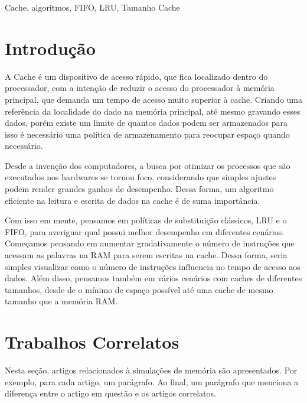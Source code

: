 \documentclass[conference]{IEEEtran}
\begin{document}
\begin{IEEEkeywords}
Cache, algoritmos, FIFO, LRU, Tamanho Cache
\end{IEEEkeywords}

\section{Introdução}


A  Cache é um dispositivo de acesso rápido, que fica localizado dentro do processador, com a intenção de reduzir o acesso do processador à memória principal, que demanda um tempo de acesso muito superior à cache. Criando uma referência da localidade do dado na memória principal, até mesmo gravando esses dados,
porém existe um limite de quantos dados podem ser armazenados para isso é necessário uma política de armazenamento para reocupar espaço quando necessário.

Desde a invenção dos computadores, a busca por otimizar os processos que são executados nos hardwares se tornou foco, considerando que simples ajustes podem render grandes ganhos de desempenho. Dessa forma, um algoritmo eficiente na leitura e escrita de dados na cache é de suma importância. 

Com isso em mente, pensamos em políticas de substituição clássicos, LRU e o FIFO, para averiguar qual possui melhor desempenho em diferentes cenários. Começamos pensando em aumentar gradativamente o número de instruções que acessam as palavras na RAM para serem escritas na cache. Dessa forma, seria simples 
visualizar como o número de instruções influencia no tempo de acesso aos dados. Além disso, pensamos também em vários cenários com caches de diferentes tamanhos, desde de o mínimo de espaço possível até uma cache de mesmo tamanho que a memória RAM.

\section{Trabalhos Correlatos}

Nesta seção, artigos relacionados à simulações de memória são apresentados.
Por exemplo, para cada artigo, um parágrafo. Ao final, um parágrafo que menciona
a diferença entre o artigo em questão e os artigos correlatos.
\end{document}
